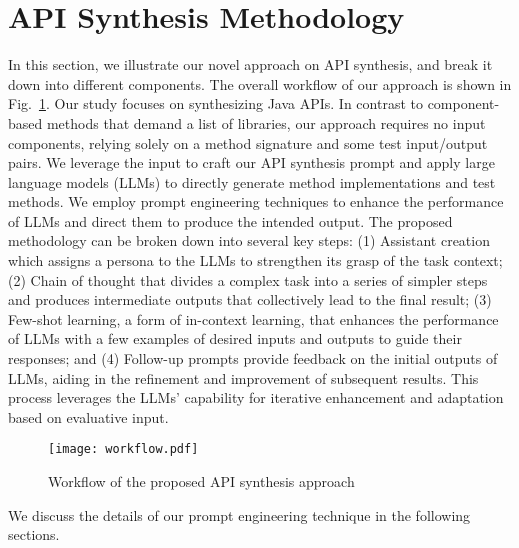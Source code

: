 \section{API Synthesis Methodology}
\label{sec:approach}
In this section, we illustrate our novel approach on API synthesis, and break it down into different components. The overall workflow of our approach is shown in Fig.~\ref{fig:figure3}. Our study focuses on synthesizing Java APIs. In contrast to component-based methods that demand a list of libraries, our approach requires no input components, relying solely on a method signature and some test input/output pairs. We leverage the input to craft our API synthesis prompt and apply large language models (LLMs) to directly generate method implementations and test methods. We employ prompt engineering techniques to enhance the performance of LLMs and direct them to produce the intended output. The proposed methodology  can be broken down into several key steps: 
(1) Assistant creation which assigns a persona to the LLMs to strengthen its grasp of the task context;
(2) Chain of thought that divides a complex task into a series of simpler steps and produces intermediate outputs that collectively lead to the final result;
(3) Few-shot learning, a form of in-context learning, that enhances the performance of LLMs with a few examples of desired inputs and outputs to guide their responses;
and (4) Follow-up prompts provide feedback on the initial outputs of LLMs, aiding in the refinement and improvement of subsequent results. This process leverages the LLMs' capability for iterative enhancement and adaptation based on evaluative input.

\begin{figure}[h]
    \centering
    \texttt{[image: workflow.pdf]}
    \caption{Workflow of the proposed API synthesis approach}
    \label{fig:figure3}
\end{figure}

We discuss the details of our prompt engineering technique in the following sections.

